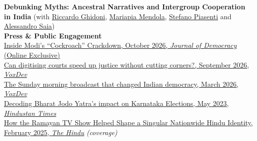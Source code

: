 \documentclass[letterpaper,11pt]{article}
\begin{document}
\vspace{0.2cm}
\textbf{Debunking Myths: Ancestral Narratives and Intergroup Cooperation in India} (with 
\href{https://sites.google.com/site/riccardoghidoni/}{Riccardo Ghidoni}, 
\href{https://sites.google.com/site/mariapiamendola/home}{Mariapia Mendola}, \href{https://sites.google.com/view/stefanopiasenti/home-page}{Stefano Piasenti} and
\href{https://sites.google.com/site/asaia9585/}{Alessandro Saia})\\




\vspace{0.25cm}
\textbf{\Large Press \& Public Engagement}\\

\href{https://www.journalofdemocracy.org/online-exclusive/inside-modis-cockroach-crackdown/}{Inside Modi's ``Cockroach'' Crackdown, October 2026, {\textit{Journal of Democracy}} (Online Exclusive)}\\

\href{https://voxdev.org/topic/institutions-political-economy/can-digitising-courts-speed-justice-without-cutting-corners}{Can digitising courts speed up justice without cutting corners?, September 2026, {\textit{VoxDev}}}\\

\href{https://voxdev.org/topic/institutions-political-economy/sunday-morning-broadcast-changed-indian-democracy}{The Sunday morning broadcast that changed Indian democracy, March 2026, {\textit{VoxDev}}}\\

\href{https://www.hindustantimes.com/india-news/bharat-jodo-yatra-boosts-congress-strike-rate-and-vote-share-in-karnataka-s-2023-elections-data-analysis-101684006733079.html}{Decoding Bharat Jodo Yatra's impact on Karnataka Elections, May 2023, {\textit{Hindustan Times}}}\\

\href{https://www.thehindu.com/society/how-the-ramayan-tv-show-helped-shape-a-singular-nationwide-hindu-identity/article69202807.ece}{How the Ramayan TV Show Helped Shape a Singular Nationwide Hindu Identity, February 2025, {\textit{The Hindu}}} \textit{(coverage)}
\end{document}
